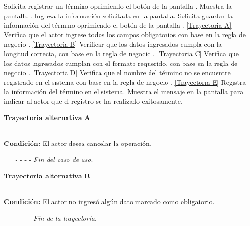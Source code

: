 	\begin{UCtrayectoria}
		\UCpaso[\UCactor] Solicita registrar un término oprimiendo el botón  de la pantalla .
		\UCpaso[\UCsist] Muestra la pantalla .
		\UCpaso[\UCactor] Ingresa la información solicitada en la pantalla. \label{CU6.1-P3}
		\UCpaso[\UCactor] Solicita guardar la información del término oprimiendo el botón  de la pantalla . \hyperlink{CU6-1:TAA}{[Trayectoria A]}
		\UCpaso[\UCsist] Verifica que el actor ingrese todos los campos obligatorios con base en la regla de negocio . \hyperlink{CU6-1:TAB}{[Trayectoria B]}
		\UCpaso[\UCsist] Verificar que los datos ingresados cumpla con la longitud correcta, con base en la regla de negocio . \hyperlink{CU6-1:TAC}{[Trayectoria C]}
		\UCpaso[\UCsist] Verifica que los datos ingresados cumplan con el formato requerido, con base en la regla de negocio . \hyperlink{CU6-1:TAD}{[Trayectoria D]}
		\UCpaso[\UCsist] Verifica que el nombre del término no se encuentre registrado en el sistema con base en la regla de negocio . \hyperlink{CU6-1:TAE}{[Trayectoria E]}
		\UCpaso[\UCsist] Registra la información del término en el sistema.
		\UCpaso[\UCsist] Muestra el mensaje  en la pantalla  para indicar al actor que el registro se ha realizado exitosamente.
	\end{UCtrayectoria}		
	\hypertarget{CU6-1:TAA}{\textbf{Trayectoria alternativa A}}\\
	\noindent \textbf{Condición:} El actor desea cancelar la operación.
	\begin{enumerate}
		\UCpaso[\UCactor] Solicita cancelar la operación oprimiendo el botón  de la pantalla 
		\UCpaso[\UCsist] Muestra la pantalla .
		\item[- -] - - {\em {Fin del caso de uso}}.%
	\end{enumerate}
\hypertarget{CU6-1:TAB}{\textbf{Trayectoria alternativa B}}\\
\noindent \textbf{Condición:} El actor no ingresó algún dato marcado como obligatorio.
\begin{enumerate}
	\UCpaso[\UCsist] Muestra el mensaje  señalando el campo que presenta el error en la pantalla .
	\UCpaso Regresa al paso \ref{CU6.1-P3} de la trayectoria principal.
	\item[- -] - - {\em {Fin de la trayectoria}}.%
\end{enumerate}
